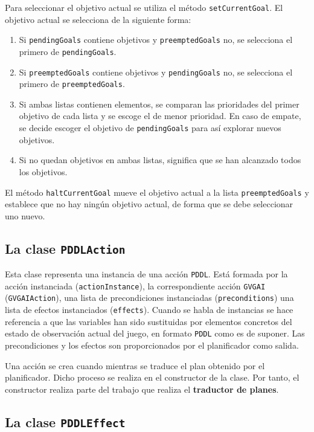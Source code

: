 Para seleccionar el objetivo actual se utiliza el método \texttt{setCurrentGoal}. El objetivo actual
se selecciona de la siguiente forma:

\begin{enumerate}[label=\arabic*º]
    \item Si \texttt{pendingGoals} contiene objetivos y \texttt{preemptedGoals} no, se selecciona
    el primero de \texttt{pendingGoals}.
    \item Si \texttt{preemptedGoals} contiene objetivos y \texttt{pendingGoals} no, se selecciona
    el primero de \texttt{preemptedGoals}.
    \item Si ambas listas contienen elementos, se comparan las prioridades del primer objetivo
    de cada lista y se escoge el de menor prioridad. En caso de empate, se decide escoger el
    objetivo de \texttt{pendingGoals} para así explorar nuevos objetivos.
    \item Si no quedan objetivos en ambas listas, significa que se han alcanzado todos los objetivos.
\end{enumerate}

El método \texttt{haltCurrentGoal} mueve el objetivo actual a la lista \texttt{preemptedGoals}
y establece que no hay ningún objetivo actual, de forma que se debe seleccionar uno nuevo.

\subsection{La clase \texttt{PDDLAction}}

Esta clase representa una instancia de una acción \texttt{PDDL}. Está formada por la acción instanciada
(\texttt{actionInstance}), la correspondiente acción \texttt{GVGAI} (\texttt{GVGAIAction}), una lista
de precondiciones instanciadas (\texttt{preconditions}) una lista de efectos instanciados (\texttt{effects}).
Cuando se habla de instancias se hace referencia a que las variables han sido sustituidas por elementos
concretos del estado de observación actual del juego, en formato \texttt{PDDL} como es de suponer.
Las precondiciones y los efectos son proporcionados por el planificador como salida.

Una acción se crea cuando mientras se traduce el plan obtenido por el planificador. Dicho proceso
se realiza en el constructor de la clase. Por tanto, el constructor realiza parte del trabajo que realiza
el \textbf{traductor de planes}.

\subsection{La clase \texttt{PDDLEffect}}

